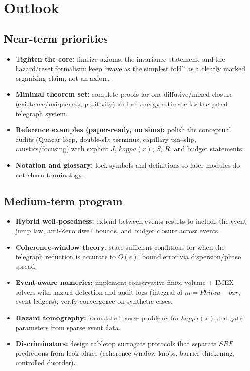 \documentclass[12pt]{article}
\newcommand{\FoldDensity}{\Phi}
\newcommand{\FoldTime}{\bar{\tau}}
\newcommand{\Threshold}{\kappa}
\newcommand{\Survival}{S}
\newcommand{\Release}{R}
\newcommand{\SRF}{\mathcal{F}_{\mathrm{SR}}}
\def\FoldDensity{Phi}%
\def\FoldTime{tau-bar}%
\def\Threshold{kappa}%
\def\SRF{SRF}%
\def\Survival{S}%
\def\Release{R}%
\def\bar#1{#1}%
\def\mathcal#1{#1}%
\def\mathrm#1{#1}%
\begin{document}

\section{Outlook}

\subsection{Near-term priorities}
\begin{itemize}
  \item \textbf{Tighten the core:} finalize axioms, the invariance statement, and the hazard/reset formalism; keep ``wave as the simplest fold'' as a clearly marked organizing claim, not an axiom.
  \item \textbf{Minimal theorem set:} complete proofs for one diffusive/mixed closure (existence/uniqueness, positivity) and an energy estimate for the gated telegraph system.
  \item \textbf{Reference examples (paper-ready, no sims):} polish the conceptual audits (Quaoar loop, double-slit terminus, capillary pin--slip, caustics/focusing) with explicit $J$, $\Threshold(x)$, $\Survival$, $\Release$, and budget statements.
  \item \textbf{Notation and glossary:} lock symbols and definitions so later modules do not churn terminology.
\end{itemize}

\subsection{Medium-term program}
\begin{itemize}
  \item \textbf{Hybrid well-posedness:} extend between-events results to include the event jump law, anti-Zeno dwell bounds, and budget closure across events.
  \item \textbf{Coherence-window theory:} state sufficient conditions for when the telegraph reduction is accurate to $O(\epsilon)$; bound error via dispersion/phase spread.
  \item \textbf{Event-aware numerics:} implement conservative finite-volume + IMEX solvers with hazard detection and audit logs (integral of $m=\FoldDensity\FoldTime$, event ledgers); verify convergence on synthetic cases.
  \item \textbf{Hazard tomography:} formulate inverse problems for $\Threshold(x)$ and gate parameters from sparse event data.
  \item \textbf{Discriminators:} design tabletop surrogate protocols that separate $\SRF$ predictions from look-alikes (coherence-window knobs, barrier thickening, controlled disorder).
\end{itemize}
\end{document}
